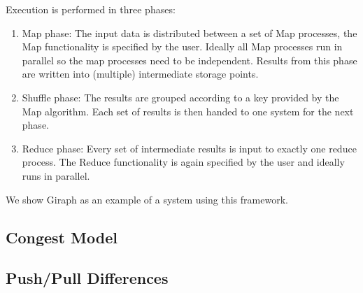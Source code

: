 Execution is performed in three phases:
\begin{enumerate}
	\item Map phase: The input data is distributed between a set of Map processes, the Map functionality is specified by the user. Ideally all Map processes run in parallel so the map processes need to be independent. Results from this phase are written into (multiple) intermediate storage points.
	\item Shuffle phase: The results are grouped according to a key provided by the Map algorithm. Each set of results is then handed to one system for the next phase.
	\item Reduce phase: Every set of intermediate results is input to exactly one reduce process. The Reduce functionality is again specified by the user and ideally runs in parallel.
\end{enumerate}

We show Giraph \cite{Giraph} as an example of a system using this framework.

\subsection{Congest Model}



\subsection{Push/Pull Differences}
